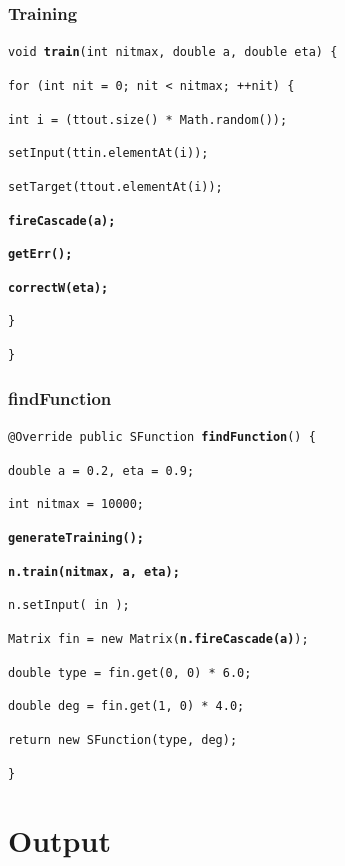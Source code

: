 \documentclass{beamer}
\begin{document}
\begin{frame}
  \frametitle{Training}
  \texttt{void \textbf{train}(int nitmax, double a, double eta) \{}

  \texttt{\qquad for (int nit = 0; nit < nitmax; ++nit) \{}

  \texttt{\qquad\qquad int i = (ttout.size() * Math.random());}

  \texttt{\qquad\qquad setInput(ttin.elementAt(i));}

  \texttt{\qquad\qquad setTarget(ttout.elementAt(i));}

  \vspace{0.2cm}

  \texttt{\qquad\qquad \textbf{fireCascade(a);}}

  \texttt{\qquad\qquad \textbf{getErr();}}

  \texttt{\qquad\qquad \textbf{correctW(eta);}}

  \texttt{\qquad\}}

  \texttt{\}}

\end{frame}

\begin{frame}
  \frametitle{findFunction}
  \texttt{@Override public SFunction \textbf{findFunction}() \{}

  \texttt{\qquad double a = 0.2, eta = 0.9;}

  \texttt{\qquad int nitmax = 10000;}

  \texttt{\qquad \textbf{generateTraining();}}

  \texttt{\qquad \textbf{n.train(nitmax, a, eta);}}

  \texttt{\qquad n.setInput( in );}

  \texttt{\qquad Matrix fin = new Matrix(\textbf{n.fireCascade(a)});}

  \texttt{\qquad double type = fin.get(0, 0) * 6.0;}

  \texttt{\qquad double deg = fin.get(1, 0) * 4.0;}

  \texttt{\qquad return new SFunction(type, deg);}

  \texttt{\}}

\end{frame}

\section{Output}
\begin{frame}
  \tableofcontents
\end{frame}
\end{document}
